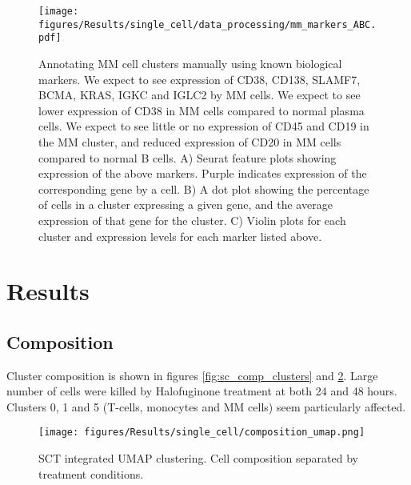 \begin{figure}[p]
    \centering
    \texttt{[image: figures/Results/single\_cell/data\_processing/mm\_markers\_ABC.pdf]}
    \caption[Manual annotation of MM cells]{Annotating MM cell clusters manually using known biological markers.
    We expect to see expression of CD38, CD138, SLAMF7, BCMA, KRAS, IGKC and IGLC2 by MM cells.
    We expect to see lower expression of CD38 in MM cells compared to normal plasma cells.
    We expect to see little or no expression of CD45 and CD19 in the MM cluster, and reduced expression of CD20 in MM cells compared to normal B cells.
    A) Seurat feature plots showing expression of the above markers.
    Purple indicates expression of the corresponding gene by a cell.
    B) A dot plot showing the percentage of cells in a cluster expressing a given gene, and the average expression of that gene for the cluster.
    C) Violin plots for each cluster and expression levels for each marker listed above.  }
    \label{fig:mm_markers}
\end{figure}



\section{Results}

\subsection{Composition}
Cluster composition is shown in figures \ref{fig:sc_comp_clusters} and \ref{fig:sc_umap_comp}.
Large number of cells were killed by Halofuginone treatment at both 24 and 48 hours.
Clusters 0, 1 and 5 (T-cells, monocytes and MM cells) seem particularly affected.

\begin{figure}[htb]
\centering
\texttt{[image: figures/Results/single\_cell/composition\_umap.png]}
\caption[UMAP cluster composition]{SCT integrated UMAP clustering. Cell composition separated by treatment conditions. }
\label{fig:sc_umap_comp}
\end{figure}


